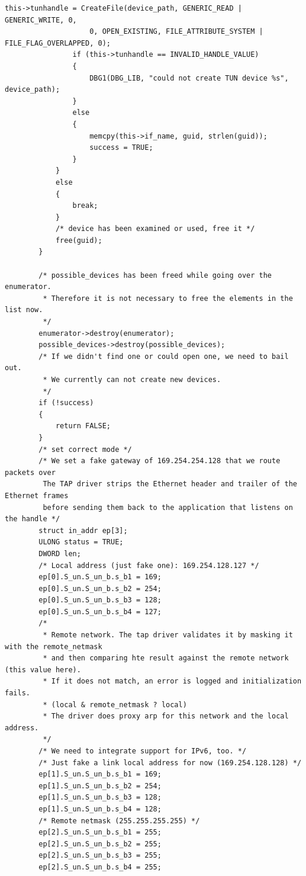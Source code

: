 {\begin{lstlisting}[caption=Konfiguration eines TAP-Geräts,label=lst:tap-device-configuration]
                this->tunhandle = CreateFile(device_path, GENERIC_READ | GENERIC_WRITE, 0,
                    0, OPEN_EXISTING, FILE_ATTRIBUTE_SYSTEM | FILE_FLAG_OVERLAPPED, 0);
                if (this->tunhandle == INVALID_HANDLE_VALUE)
                {
                    DBG1(DBG_LIB, "could not create TUN device %s", device_path);
                }
                else
                {
                    memcpy(this->if_name, guid, strlen(guid));
                    success = TRUE;
                }
            }
            else
            {
                break;
            }
            /* device has been examined or used, free it */
            free(guid);
        }

        /* possible_devices has been freed while going over the enumerator.
         * Therefore it is not necessary to free the elements in the list now.
         */
        enumerator->destroy(enumerator);
        possible_devices->destroy(possible_devices);
        /* If we didn't find one or could open one, we need to bail out.
         * We currently can not create new devices.
         */
        if (!success)
        {
            return FALSE;
        }
        /* set correct mode */
        /* We set a fake gateway of 169.254.254.128 that we route packets over
         The TAP driver strips the Ethernet header and trailer of the Ethernet frames
         before sending them back to the application that listens on the handle */
        struct in_addr ep[3];
        ULONG status = TRUE;
        DWORD len;
        /* Local address (just fake one): 169.254.128.127 */
        ep[0].S_un.S_un_b.s_b1 = 169;
        ep[0].S_un.S_un_b.s_b2 = 254;
        ep[0].S_un.S_un_b.s_b3 = 128;
        ep[0].S_un.S_un_b.s_b4 = 127;
        /*
         * Remote network. The tap driver validates it by masking it with the remote_netmask
         * and then comparing hte result against the remote network (this value here).
         * If it does not match, an error is logged and initialization fails.
         * (local & remote_netmask ? local)
         * The driver does proxy arp for this network and the local address.
         */
        /* We need to integrate support for IPv6, too. */
        /* Just fake a link local address for now (169.254.128.128) */
        ep[1].S_un.S_un_b.s_b1 = 169;
        ep[1].S_un.S_un_b.s_b2 = 254;
        ep[1].S_un.S_un_b.s_b3 = 128;
        ep[1].S_un.S_un_b.s_b4 = 128;
        /* Remote netmask (255.255.255.255) */
        ep[2].S_un.S_un_b.s_b1 = 255;
        ep[2].S_un.S_un_b.s_b2 = 255;
        ep[2].S_un.S_un_b.s_b3 = 255;
        ep[2].S_un.S_un_b.s_b4 = 255;


\end{lstlisting}}
